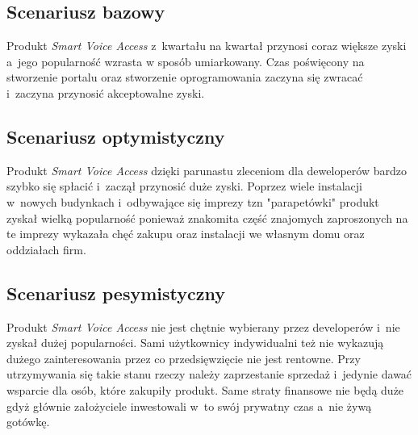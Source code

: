 \documentclass[../main.tex]{subfiles}
\begin{document}
 {

    \subsection{Scenariusz bazowy}
    \label{chapter7:mozliwosci_zagrozenia:bazowy} {
        Produkt \textit{Smart Voice Access} z~kwartału na kwartał przynosi coraz
        większe zyski a~jego popularność wzrasta w sposób umiarkowany. Czas poświęcony
        na stworzenie portalu oraz stworzenie oprogramowania zaczyna się zwracać
        i~zaczyna przynosić akceptowalne zyski.
    }

    \subsection{Scenariusz optymistyczny}
    \label{chapter7:mozliwosci_zagrozenia:optymistyczny} {
        Produkt \textit{Smart Voice Access} dzięki parunastu zleceniom dla
        deweloperów bardzo szybko się spłacić i~zaczął przynosić duże zyski. Poprzez
        wiele instalacji w~nowych budynkach i~odbywające się imprezy tzn "parapetówki"
        produkt zyskał wielką popularność ponieważ znakomita część znajomych
        zaproszonych na te imprezy wykazała chęć zakupu oraz instalacji we własnym domu
        oraz oddziałach firm.
    }

    \subsection{Scenariusz pesymistyczny}
    \label{chapter7:mozliwosci_zagrozenia:pesymistyczny} {
        Produkt \textit{Smart Voice Access} nie jest chętnie wybierany przez
        developerów i~nie zyskał dużej popularności. Sami użytkownicy indywidualni też
        nie wykazują dużego zainteresowania przez co przedsięwzięcie nie jest rentowne.
        Przy utrzymywania się takie stanu rzeczy należy zaprzestanie sprzedaż i~jedynie
        dawać wsparcie dla osób, które zakupiły produkt. Same straty finansowe nie będą
        duże gdyż głównie założyciele inwestowali w~to swój prywatny czas a~nie żywą
        gotówkę.
    }
}
\end{document}
